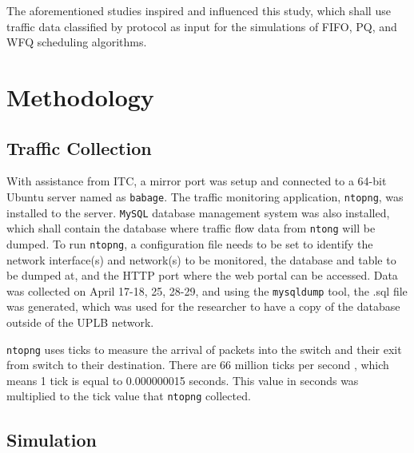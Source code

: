 \documentclass[journal]{IEEE/IEEEtran}
\begin{document}
The aforementioned studies inspired and influenced this study, which shall use traffic data classified by protocol as input for the simulations of FIFO, PQ, and WFQ scheduling algorithms.

\section{Methodology}
\subsection{Traffic Collection}
With assistance from ITC, a mirror port was setup and connected to a 64-bit Ubuntu server named as \texttt{babage}. The traffic monitoring application, \texttt{ntopng}, was installed to the server. \texttt{MySQL} database management system was also installed, which shall contain the database where traffic flow data from \texttt{ntong} will be dumped. To run \texttt{ntopng}, a configuration file needs to be set to identify the network interface(s) and network(s) to be monitored, the database and table to be dumped at, and the HTTP port where the web portal can be accessed. Data was collected on April 17-18, 25, 28-29, and using the \texttt{mysqldump} tool, the .sql file was generated, which was used for the researcher to have a copy of the database outside of the UPLB network. 

\texttt{ntopng} uses ticks to measure the arrival of packets into the switch and their exit from switch to their destination. There are 66 million ticks per second \cite{webopedia_2017}, which means 1 tick is equal to 0.000000015 seconds. This value in seconds was multiplied to the tick value that \texttt{ntopng} collected.

\subsection{Simulation}
\end{document}
